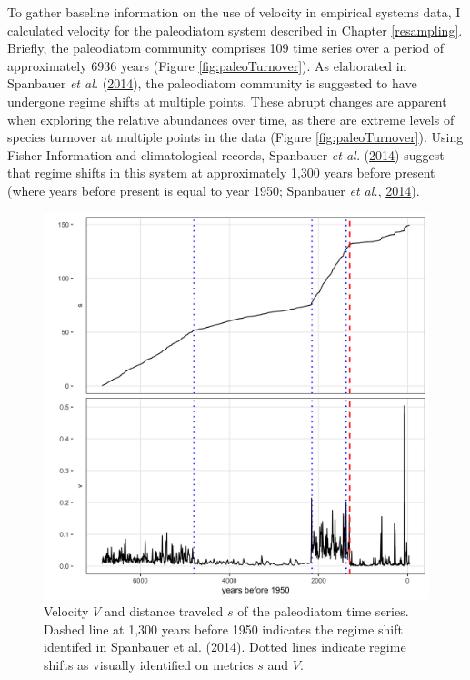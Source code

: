 \documentclass[print]{nuthesis}
\begin{document}
To gather baseline information on the use of velocity in empirical systems data, I calculated velocity for the paleodiatom system described in Chapter \ref{resampling}. Briefly, the paleodiatom community comprises 109 time series over a period of approximately 6936 years (Figure \ref{fig:paleoTurnover}). As elaborated in Spanbauer \emph{et al.} (\protect\hyperlink{ref-spanbauer_prolonged_2014}{2014}), the paleodiatom community is suggested to have undergone regime shifts at multiple points. These abrupt changes are apparent when exploring the relative abundances over time, as there are extreme levels of species turnover at multiple points in the data (Figure \ref{fig:paleoTurnover}). Using Fisher Information and climatological records, Spanbauer \emph{et al.} (\protect\hyperlink{ref-spanbauer_prolonged_2014}{2014}) suggest that regime shifts in this system at approximately 1,300 years before present (where years before present is equal to year 1950; Spanbauer \emph{et al.}, \protect\hyperlink{ref-spanbauer_prolonged_2014}{2014}).
\begin{figure}
\includegraphics[width=0.85\linewidth]{./chapterFiles/velocity/figsCalledInDiss/paleoVelocity} \caption{Velocity $V$ and distance traveled $s$ of the paleodiatom time series. Dashed line at 1,300 years before 1950 indicates the regime shift identifed in Spanbauer et al. (2014). Dotted lines indicate regime shifts as visually identified on metrics $s$ and $V$.}\label{fig:paleoVelocity}
\end{figure}
\end{document}
